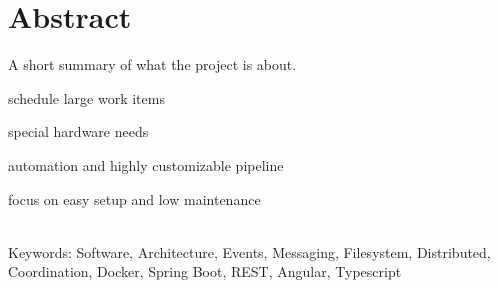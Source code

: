 
\chapter*{Abstract} %
 
 

A short summary of what the project is about.


schedule large work items

special hardware needs

automation and highly customizable pipeline

focus on easy setup  and low maintenance

~\\
Keywords: Software, Architecture, Events, Messaging, Filesystem, Distributed, Coordination, Docker, Spring Boot, REST, Angular, Typescript